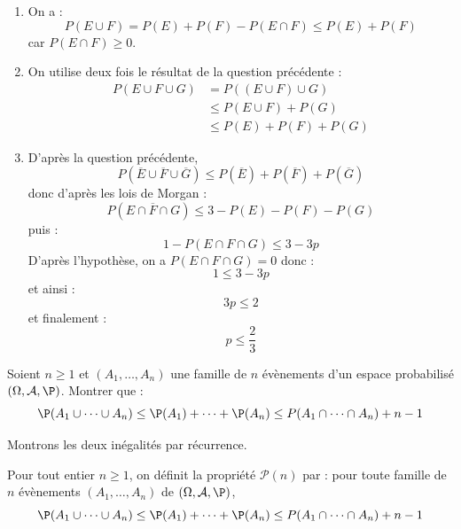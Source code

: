\documentclass[a4paper,10pt]{report}
\begin{document}
\corr 
\begin{enumerate}
\item On a :
$$ P(E \cup F) = P(E) + P(F) - P(E \cap F) \leq P(E)+P(F)$$
car $P(E \cap F) \geq 0$.
\item On utilise deux fois le résultat de la question précédente :
\begin{align*}
P(E \cup F \cup G) & = P((E \cup F) \cup G) \\
& \leq P(E \cup F) + P(G) \\
& \leq P(E) + P(F) + P(G)
\end{align*}
\item D'après la question précédente,
$$ P(\overline{E} \cup \overline{F} \cup \overline{G})  \leq  P(\overline{E}) + P(\overline{F}) + P(\overline{G})$$
donc d'après les lois de Morgan :
$$ P(\overline{E \cap F \cap G}) \leq 3-P(E)-P(F)-P(G)$$
puis :
$$ 1-P(E \cap F \cap G) \leq 3-3p$$
D'après l'hypothèse, on a $P(E \cap F \cap G)=0$ donc :
$$ 1 \leq 3-3p$$
et ainsi :
$$3p \leq 2$$
et finalement :
$$ p \leq \dfrac{2}{3}$$
\end{enumerate}


\begin{Exa} Soient $n \geq 1$ et $(A_1, \ldots, A_n)$ une famille de $n$ évènements d'un espace probabilisé $(\Omega, \mathcal{A}, \P)$. Montrer que :
$$ \P(A_1 \cup \cdots \cup A_n) \leq \P(A_1) + \cdots + \P(A_n) \leq P(A_1 \cap \cdots \cap A_n) + n-1$$
\end{Exa}

\corr Montrons les deux inégalités par récurrence.

\medskip

\noindent Pour tout entier $n \geq 1$, on définit la propriété $\mathcal{P}(n)$ par : pour toute famille de $n$ évènements $(A_1, \ldots, A_n)$ de $(\Omega, \mathcal{A}, \P)$, 
$$ \P(A_1 \cup \cdots \cup A_n) \leq \P(A_1) + \cdots + \P(A_n) \leq P(A_1 \cap \cdots \cap A_n) + n-1$$
\end{document}
